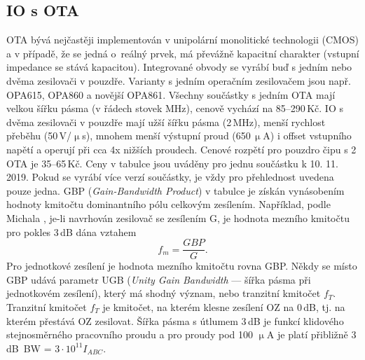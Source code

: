 \subsection{IO s OTA}
OTA bývá nejčastěji implementován v unipolární monolitické technologii (CMOS) a v případě, že se jedná o~reálný prvek, má převážně kapacitní charakter (vstupní impedance se stává kapacitou). Integrované obvody se vyrábí buď s jedním nebo dvěma zesilovači v pouzdře. Varianty s jedním operačním zesilovačem jsou např. OPA615, OPA860 a novější OPA861. Všechny součástky s jedním OTA mají velkou šířku pásma (v řádech stovek MHz), cenově vychází na 85--290\,Kč. IO s dvěma zesilovači v pouzdře mají užší šířku pásma (2\,MHz), menší rychlost přeběhu (50\,V/$\upmu$s), mnohem menší výstupní proud (650\,$\upmu$A) i offset vstupního napětí a operují při cca 4x nižších proudech. Cenové rozpětí pro pouzdro čipu s 2 OTA je 35--65\,Kč. Ceny v tabulce jsou uváděny pro jednu součástku k 10. 11. 2019. Pokud se vyrábí více verzí součástky, je vždy pro přehlednost uvedena pouze jedna. GBP (\textit{Gain-Bandwidth Product}) v tabulce je získán vynásobením hodnoty kmitočtu dominantního pólu celkovým zesílením. Například, podle Michala \cite{14}, je-li navrhován zesilovač se zesílením G, je hodnota mezního kmitočtu pro pokles 3\,dB dána vztahem
\begin{equation}
f_m = \frac{GBP}{G}.
\end{equation}
\noindent Pro jednotkové zesílení je hodnota mezního kmitočtu rovna GBP. Někdy se místo GBP udává parametr UGB (\textit{Unity Gain Bandwidth} --- šířka pásma při jednotkovém zesílení), který má shodný význam, nebo tranzitní kmitočet $f_T$. Tranzitní kmitočet $f_T$ je kmitočet, na kterém klesne zesílení OZ na 0\,dB, tj. na kterém přestává OZ zesilovat. Šířka pásma s útlumem 3\,dB je funkcí klidového stejnosměrného pracovního proudu a pro proudy pod 100 $\upmu$A je platí přibližně 3\,dB\ BW = $3 \cdot 10^{11} I_{ABC}$.
\renewcommand{\arraystretch}{1.5}
